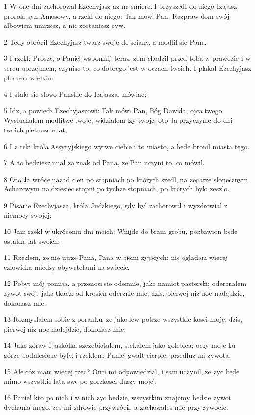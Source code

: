 \par 1 W one dni zachorowal Ezechyjasz az na smierc. I przyszedl do niego Izajasz prorok, syn Amosowy, a rzekl do niego: Tak mówi Pan: Rozpraw dom swój; albowiem umrzesz, a nie zostaniesz zyw.
\par 2 Tedy obrócil Ezechyjasz twarz swoje do sciany, a modlil sie Panu.
\par 3 I rzekl: Prosze, o Panie! wspomnij teraz, zem chodzil przed toba w prawdzie i w sercu uprzejmem, czyniac to, co dobrego jest w oczach twoich. I plakal Ezechyjasz placzem wielkim.
\par 4 I stalo sie slowo Panskie do Izajasza, mówiac:
\par 5 Idz, a powiedz Ezechyjaszowi: Tak mówi Pan, Bóg Dawida, ojca twego: Wysluchalem modlitwe twoje, widzialem lzy twoje; oto Ja przyczynie do dni twoich pietnascie lat;
\par 6 I z reki króla Assyryjskiego wyrwe ciebie i to miasto, a bede bronil miasta tego.
\par 7 A to bedziesz mial za znak od Pana, ze Pan uczyni to, co mówil.
\par 8 Oto Ja wróce nazad cien po stopniach po których szedl, na zegarze slonecznym Achazowym na dziesiec stopni po tychze stopniach, po których bylo zeszlo.
\par 9 Pisanie Ezechyjasza, króla Judzkiego, gdy byl zachorowal i wyzdrowial z niemocy swojej:
\par 10 Jam rzekl w ukróceniu dni moich: Wnijde do bram grobu, pozbawion bede ostatka lat swoich;
\par 11 Rzeklem, ze nie ujrze Pana, Pana w ziemi zyjacych; nie ogladam wiecej czlowieka miedzy obywatelami na swiecie.
\par 12 Pobyt mój pomija, a przenosi sie odemnie, jako namiot pasterski; oderznalem zywot swój, jako tkacz; od krosien oderznie mie; dzis, pierwej niz noc nadejdzie, dokonasz mie.
\par 13 Rozmyslalem sobie z poranku, ze jako lew potrze wszystkie kosci moje, dzis, pierwej niz noc nadejdzie, dokonasz mie.
\par 14 Jako zóraw i jaskólka szczebiotalem, stekalem jako golebica; oczy moje ku górze podniesione byly, i rzeklem: Panie! gwalt cierpie, przedluz mi zywota.
\par 15 Ale cóz mam wiecej rzec? Onci mi odpowiedzial, i sam uczynil, ze zyc bede mimo wszystkie lata swe po gorzkosci duszy mojej.
\par 16 Panie! kto po nich i w nich zyc bedzie, wszystkim znajomy bedzie zywot dychania mego, zes mi zdrowie przywrócil, a zachowales mie przy zywocie.
